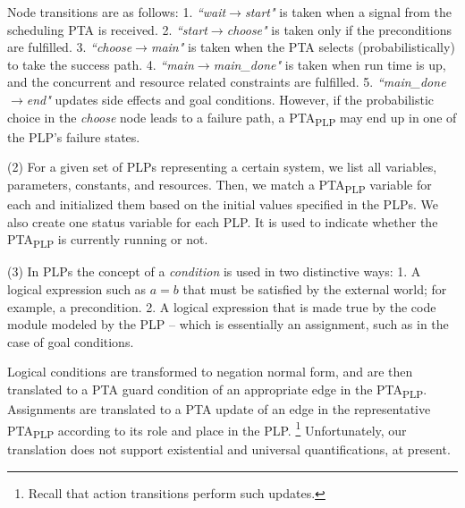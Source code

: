 \documentclass[letterpaper]{article}
\begin{document}
\par Node transitions
are as follows: 1. \textit{``wait$\rightarrow$start"} is taken when a signal from the scheduling PTA is received. 2. \textit{``start$\rightarrow$choose"} is taken only if the preconditions are fulfilled. 3.  \textit{``choose$\rightarrow$main"} is taken when the PTA selects (probabilistically) to take the success path. 4. \textit{``main$\rightarrow$main\_done"} is taken when run time is up, and the concurrent and resource related constraints are fulfilled. 5. \textit{``main\_done$\rightarrow$end"} updates  side effects and goal conditions.
However, if the probabilistic choice in the \textit{choose} node leads to a failure path,
a PTA\textsubscript{PLP} may end up in one of the PLP’s failure states.

(2) For a given set of PLPs representing a certain system, we list all variables, parameters, constants, and resources. Then, we match a PTA\textsubscript{PLP} variable for each and initialized them based on
the initial values specified in the PLPs. We also create one status variable for each PLP. It is used to
indicate whether the PTA\textsubscript{PLP} is currently running or not.

(3) %
In PLPs the concept of a \textit{condition} is used in two distinctive ways: 1.  A logical expression  such as $a=b$ that must be satisfied by the external world; for example, a precondition.
2. A logical expression that is made true by the code module modeled by the PLP -- which is essentially an assignment, such as in the case of goal conditions.
\par Logical conditions are transformed to negation normal form, and
are then translated to a PTA guard condition of an appropriate edge in the PTA\textsubscript{PLP}.
Assignments are translated to a PTA update of an edge in
the representative PTA\textsubscript{PLP} according to its role and place in the PLP.%
\footnote{Recall that action transitions perform such updates.}
Unfortunately, our translation does not support existential and universal quantifications,
at present.
\end{document}
